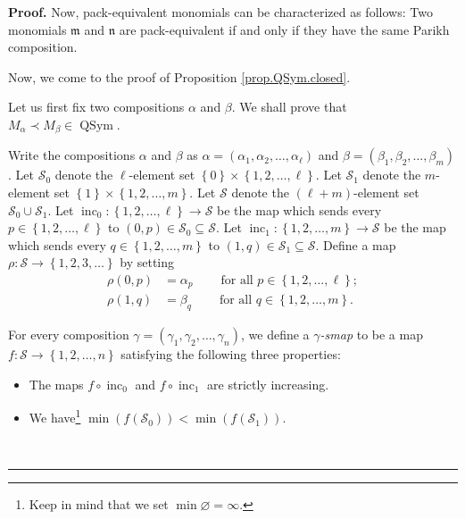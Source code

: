 \documentclass
[numbers=enddot,12pt,final,onecolumn,notitlepage,abstracton]{scrartcl}%
\theoremstyle{definition}
\newenvironment{proof}[1][Proof]{\noindent\textbf{#1.} }{\ \rule{0.5em}{0.5em}}
\begin{document}
\begin{proof}
Now, pack-equivalent monomials can be characterized as follows: Two monomials
$\mathfrak{m}$ and $\mathfrak{n}$ are pack-equivalent if and only if they have
the same Parikh composition.

Now, we come to the proof of Proposition \ref{prop.QSym.closed}.

Let us first fix two compositions $\alpha$ and $\beta$. We shall prove that
$M_{\alpha}\left.  \prec\right.  M_{\beta}\in\operatorname*{QSym}$.

Write the compositions $\alpha$ and $\beta$ as $\alpha=\left(  \alpha
_{1},\alpha_{2},\ldots,\alpha_{\ell}\right)  $ and $\beta=\left(  \beta
_{1},\beta_{2},\ldots,\beta_{m}\right)  $. Let $\mathcal{S}_{0}$ denote the
$\ell$-element set $\left\{  0\right\}  \times\left\{  1,2,\ldots
,\ell\right\}  $. Let $\mathcal{S}_{1}$ denote the $m$-element set $\left\{
1\right\}  \times\left\{  1,2,\ldots,m\right\}  $. Let $\mathcal{S}$ denote
the $\left(  \ell+m\right)  $-element set $\mathcal{S}_{0}\cup\mathcal{S}_{1}%
$. Let $\operatorname*{inc}\nolimits_{0}:\left\{  1,2,\ldots,\ell\right\}
\rightarrow\mathcal{S}$ be the map which sends every $p\in\left\{
1,2,\ldots,\ell\right\}  $ to $\left(  0,p\right)  \in\mathcal{S}_{0}%
\subseteq\mathcal{S}$. Let $\operatorname*{inc}\nolimits_{1}:\left\{
1,2,\ldots,m\right\}  \rightarrow\mathcal{S}$ be the map which sends every
$q\in\left\{  1,2,\ldots,m\right\}  $ to $\left(  1,q\right)  \in
\mathcal{S}_{1}\subseteq\mathcal{S}$. Define a map $\rho:\mathcal{S}%
\rightarrow\left\{  1,2,3,\ldots\right\}  $ by setting%
\begin{align*}
\rho\left(  0,p\right)   &  =\alpha_{p}\ \ \ \ \ \ \ \ \ \ \text{for all }%
p\in\left\{  1,2,\ldots,\ell\right\}  ;\\
\rho\left(  1,q\right)   &  =\beta_{q}\ \ \ \ \ \ \ \ \ \ \text{for all }%
q\in\left\{  1,2,\ldots,m\right\}  .
\end{align*}


For every composition $\gamma=\left(  \gamma_{1},\gamma_{2},\ldots,\gamma
_{n}\right)  $, we define a $\gamma$\textit{-smap} to be a map $f:\mathcal{S}%
\rightarrow\left\{  1,2,\ldots,n\right\}  $ satisfying the following three properties:

\begin{itemize}
\item The maps $f\circ\operatorname*{inc}\nolimits_{0}$ and $f\circ
\operatorname*{inc}\nolimits_{1}$ are strictly increasing.

\item We have\footnote{Keep in mind that we set $\min\varnothing=\infty$.}
$\min\left(  f\left(  \mathcal{S}_{0}\right)  \right)  <\min\left(  f\left(
\mathcal{S}_{1}\right)  \right)  $.


\end{itemize}
\end{proof}
\end{document}
